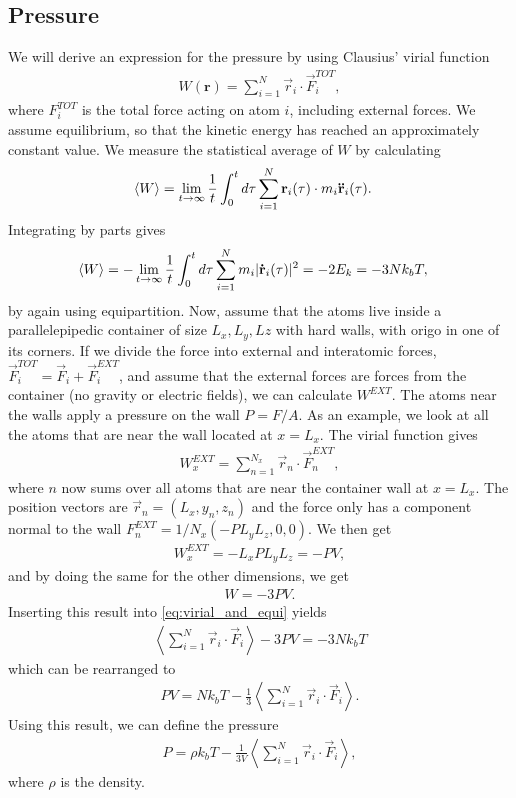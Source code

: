 \subsection{Pressure}
We will derive an expression for the pressure by using Clausius' virial function
\begin{align}
    W(\textbf{r}) = \sum_{i=1}^N \vec r_i \cdot \vec F_i^{TOT},
\end{align}
where $F_i^{TOT}$ is the total force acting on atom $i$, including external forces. We assume equilibrium, so that the kinetic energy has reached an approximately constant value. We measure the statistical average of $W$ by calculating
\begin{align}
    \langle W \rangle &= \lim_{t\rightarrow\infty} {1\over t} \int_0^t d\tau \sum_{i=1}^N \vec r_i(\tau) \cdot m_i \vec{\ddot r}_i(\tau).
\end{align}
Integrating by parts gives
\begin{align}
    \label{eq:virial_and_equi}
    \langle W \rangle &= -\lim_{t\rightarrow\infty} {1\over t} \int_0^t d\tau \sum_{i=1}^N m_i |\vec{\dot r}_i(\tau)|^2 = -2E_k = -3Nk_bT,
\end{align}
by again using equipartition. Now, assume that the atoms live inside a parallelepipedic container of size $L_x, L_y, Lz$ with hard walls, with origo in one of its corners. If we divide the force into external and interatomic forces, $\vec F_i^{TOT} = \vec F_i + \vec F_i^{EXT}$, and assume that the external forces are forces from the container (no gravity or electric fields), we can calculate $W^{EXT}$. The atoms near the walls apply a pressure on the wall $P = F/A$. As an example, we look at all the atoms that are near the wall located at $x=L_x$. The virial function gives
\begin{align}
    W^{EXT}_x = \sum_{n=1}^{N_x}\vec r_n\cdot \vec F_n^{EXT},
\end{align}
where $n$ now sums over all atoms that are near the container wall at $x=L_x$. The position vectors are $\vec r_n = (L_x, y_n, z_n)$ and the force only has a component normal to the wall $F_n^{EXT} = 1/N_x(-PL_yL_z, 0, 0)$. We then get
\begin{align}
    W^{EXT}_x = -L_xPL_yL_z = -PV,
\end{align}
and by doing the same for the other dimensions, we get
\begin{align}
    W = -3PV.
\end{align}
Inserting this result into \eqref{eq:virial_and_equi} yields
\begin{align}
    \left\langle \sum_{i=1}^N \vec r_i \cdot \vec F_i\right\rangle - 3PV = -3Nk_bT
\end{align}
which can be rearranged to
\begin{align}
    PV = Nk_bT - \frac{1}{3}\left\langle \sum_{i=1}^N \vec r_i \cdot \vec F_i\right\rangle.
\end{align}
Using this result, we can define the pressure
\begin{align}
	P = \rho k_bT - \frac{1}{3V}\left\langle \sum_{i=1}^N \vec r_i \cdot \vec F_i\right\rangle,
\end{align}
where $\rho$ is the density.
